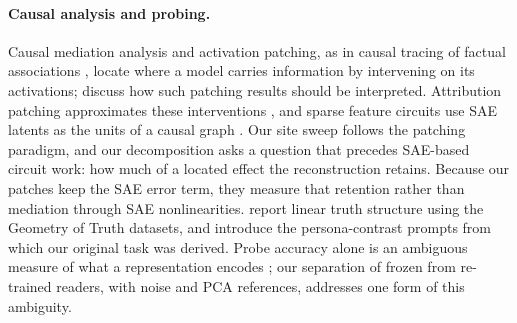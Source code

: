 \paragraph{Causal analysis and probing.} Causal mediation analysis \citep{vig2020causal} and activation patching,
as in causal tracing of factual associations \citep{meng2022locating}, locate where a model carries information by
intervening on its activations; \citet{heimersheim2024patching} discuss how such patching results should be
interpreted. Attribution patching approximates these interventions \citep{syed2023attribution}, and sparse feature
circuits use SAE latents as the units of a causal graph \citep{marks2025sparse}. Our site sweep follows the patching
paradigm, and our decomposition asks a question that precedes SAE-based circuit work: how much of a located effect the
reconstruction retains. Because our patches keep the SAE error term, they measure that retention rather than mediation
through SAE nonlinearities. \citet{marks2023geometry} report linear truth structure using the Geometry of Truth
datasets, and \citet{zou2023representation} introduce the persona-contrast prompts from which our original task was
derived. Probe accuracy alone is an ambiguous measure of what a representation encodes
\citep{hewitt2019control,belinkov2021probing}; our separation of frozen from re-trained readers, with noise and PCA
references, addresses one form of this ambiguity.
